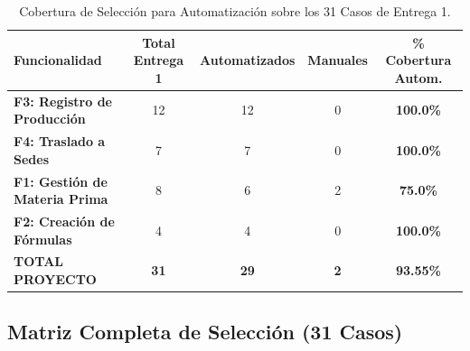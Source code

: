 \documentclass[11pt,a4paper]{article}
\begin{document}
\begin{table}[htbp]
\centering
\small
\begin{tabularx}{\textwidth}{X c c c c}
\toprule
\textbf{Funcionalidad} & \textbf{Total Entrega 1} & \textbf{Automatizados} & \textbf{Manuales} & \textbf{\% Cobertura Autom.} \\
\midrule
\textbf{F3: Registro de Producción} & 12 & 12 & 0 & \textbf{100.0\%} \\
\textbf{F4: Traslado a Sedes} & 7 & 7 & 0 & \textbf{100.0\%} \\
\textbf{F1: Gestión de Materia Prima} & 8 & 6 & 2 & \textbf{75.0\%} \\
\textbf{F2: Creación de Fórmulas} & 4 & 4 & 0 & \textbf{100.0\%} \\
\midrule
\textbf{TOTAL PROYECTO} & \textbf{31} & \textbf{29} & \textbf{2} & \textbf{93.55\%} \\
\bottomrule
\end{tabularx}
\caption{Cobertura de Selección para Automatización sobre los 31 Casos de Entrega 1.}\label{tab:seleccion_resumen}
\end{table}

\subsection{Matriz Completa de Selección (31 Casos)}
\end{document}
